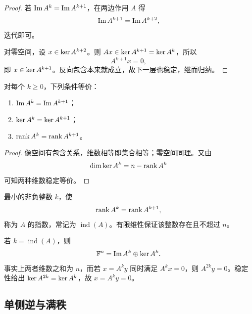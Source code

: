 \begin{proof}
若 $\operatorname{Im} A^k=\operatorname{Im} A^{k+1}$，在两边作用 $A$ 得
\begin{equation}
 \operatorname{Im} A^{k+1}=\operatorname{Im} A^{k+2},
\end{equation}
迭代即可。

对零空间，设 $x\in\operatorname{ker} A^{k+2}$。则 $Ax\in\operatorname{ker} A^{k+1}=\operatorname{ker} A^k$，所以
\begin{equation}
 A^{k+1}x=0,
\end{equation}
即 $x\in\operatorname{ker} A^{k+1}$。反向包含本来就成立，故下一层也稳定，继而归纳。
\end{proof}

\begin{theorem}
对每个 $k\geq0$，下列条件等价：
\begin{enumerate}
  \item $\operatorname{Im} A^k=\operatorname{Im} A^{k+1}$；
  \item $\operatorname{ker} A^k=\operatorname{ker} A^{k+1}$；
  \item $\operatorname{rank} A^k=\operatorname{rank} A^{k+1}$。
\end{enumerate}
\end{theorem}

\begin{proof}
像空间有包含关系，维数相等即集合相等；零空间同理。又由
\begin{equation}
 \dim\operatorname{ker} A^k=n-\operatorname{rank} A^k
\end{equation}
可知两种维数稳定等价。
\end{proof}

\begin{definition}
最小的非负整数 $k$，使
\begin{equation}
 \operatorname{rank} A^k=\operatorname{rank} A^{k+1},
\end{equation}
称为 $A$ 的指数，常记为 $\operatorname{ind}(A)$。有限维性保证该整数存在且不超过 $n$。
\end{definition}

\begin{remark}
若 $k=\operatorname{ind}(A)$，则
\begin{equation}
 \mathbb F^n=\operatorname{Im} A^k\oplus\operatorname{ker} A^k.
\end{equation}
事实上两者维数之和为 $n$，而若 $x=A^ky$ 同时满足 $A^kx=0$，则 $A^{2k}y=0$。稳定性给出 $\operatorname{ker} A^{2k}=\operatorname{ker} A^k$，故 $x=A^ky=0$。
\end{remark}

\subsection{单侧逆与满秩}

